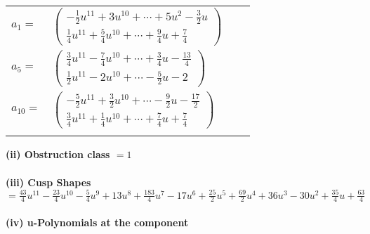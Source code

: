 \documentclass[1p]{elsarticle_modified}
\theoremstyle{definition}
\begin{document}
\begin{tabular}{m{7pt} m{180pt} m{7pt} m{180pt} }
\flushright $a_{1}=$&$\begin{pmatrix}-\frac{1}{2} u^{11}+3 u^{10}+\cdots+5 u^2-\frac{3}{2} u\\\frac{1}{4} u^{11}+\frac{5}{4} u^{10}+\cdots+\frac{9}{4} u+\frac{7}{4}\end{pmatrix}$ \\
\flushright $a_{5}=$&$\begin{pmatrix}\frac{3}{4} u^{11}-\frac{7}{4} u^{10}+\cdots+\frac{3}{4} u-\frac{13}{4}\\\frac{1}{2} u^{11}-2 u^{10}+\cdots-\frac{5}{2} u-2\end{pmatrix}$ \\
\flushright $a_{10}=$&$\begin{pmatrix}-\frac{5}{2} u^{11}+\frac{3}{2} u^{10}+\cdots-\frac{9}{2} u-\frac{17}{2}\\\frac{3}{4} u^{11}+\frac{1}{4} u^{10}+\cdots+\frac{7}{4} u+\frac{7}{4}\end{pmatrix}$\\&\end{tabular}
\flushleft \textbf{(ii) Obstruction class $= 1$}\\~\\
\flushleft \textbf{(iii) Cusp Shapes $= \frac{43}{4} u^{11}-\frac{23}{4} u^{10}-\frac{5}{4} u^9+13 u^8+\frac{183}{4} u^7-17 u^6+\frac{25}{2} u^5+\frac{69}{2} u^4+36 u^3-30 u^2+\frac{35}{4} u+\frac{63}{4}$}\\~\\
\newpage\renewcommand{\arraystretch}{1}
\flushleft \textbf{(iv) u-Polynomials at the component}\newline \\
\end{document}

